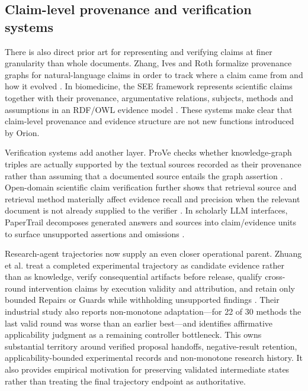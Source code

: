 \subsection{Claim-level provenance and verification systems}

There is also direct prior art for representing and verifying claims at finer granularity than whole documents. Zhang, Ives and Roth formalize provenance graphs for natural-language claims in order to track where a claim came from and how it evolved \cite{zhang2020claim}. In biomedicine, the SEE framework represents scientific claims together with their provenance, argumentative relations, subjects, methods and assumptions in an RDF/OWL evidence model \cite{boelling2014see}. These systems make clear that claim-level provenance and evidence structure are not new functions introduced by Orion.

Verification systems add another layer. ProVe checks whether knowledge-graph triples are actually supported by the textual sources recorded as their provenance rather than assuming that a documented source entails the graph assertion \cite{amaral2024prove}. Open-domain scientific claim verification further shows that retrieval source and retrieval method materially affect evidence recall and precision when the relevant document is not already supplied to the verifier \cite{vladika2024}. In scholarly LLM interfaces, PaperTrail decomposes generated answers and sources into claim/evidence units to surface unsupported assertions and omissions \cite{martinboyle2026}.

Research-agent trajectories now supply an even closer operational parent. Zhuang et al. treat a completed experimental trajectory as candidate evidence rather than as knowledge, verify consequential artifacts before release, qualify cross-round intervention claims by execution validity and attribution, and retain only bounded Repairs or Guards while withholding unsupported findings \cite{zhuang2026trajectory}. Their industrial study also reports non-monotone adaptation---for 22 of 30 methods the last valid round was worse than an earlier best---and identifies affirmative applicability judgment as a remaining controller bottleneck. This owns substantial territory around verified proposal handoffs, negative-result retention, applicability-bounded experimental records and non-monotone research history. It also provides empirical motivation for preserving validated intermediate states rather than treating the final trajectory endpoint as authoritative.

